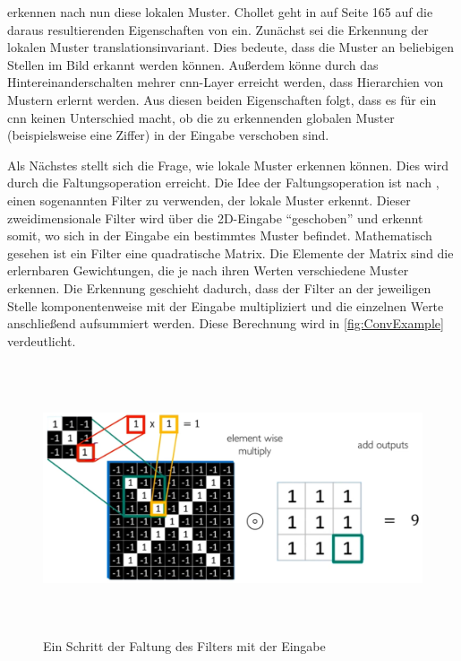 erkennen nach \cite[S. 164]{DeepLearningPythonKeras} nun diese lokalen Muster.
Chollet geht in \cite{DeepLearningPythonKeras} auf Seite 165 auf die daraus resultierenden Eigenschaften von  ein.
Zunächst sei die Erkennung der lokalen Muster translationsinvariant.
Dies bedeute, dass die Muster an beliebigen Stellen im Bild erkannt werden können.
Außerdem könne durch das Hintereinanderschalten mehrer \acrshort{cnn}-Layer erreicht werden, dass Hierarchien von Mustern erlernt werden.
Aus diesen beiden Eigenschaften folgt, dass es für ein \acrshort{cnn} keinen Unterschied macht, ob die zu erkennenden globalen Muster (beispielsweise eine Ziffer) in der Eingabe verschoben sind.

Als Nächstes stellt sich die Frage, wie  lokale Muster erkennen können.
Dies wird durch die Faltungsoperation erreicht.
Die Idee der Faltungsoperation ist nach \cite{6S191CNN}, einen sogenannten Filter zu verwenden, der lokale Muster erkennt.
Dieser zweidimensionale Filter wird über die 2D-Eingabe "`geschoben"' und erkennt somit, wo sich in der Eingabe ein bestimmtes Muster befindet.
Mathematisch gesehen ist ein Filter eine quadratische Matrix.
Die Elemente der Matrix sind die erlernbaren Gewichtungen, die je nach ihren Werten verschiedene Muster erkennen.
Die Erkennung geschieht dadurch, dass der Filter an der jeweiligen Stelle komponentenweise mit der Eingabe multipliziert und die einzelnen Werte anschließend aufsummiert werden.
Diese Berechnung wird in \autoref{fig:ConvExample} verdeutlicht.

\begin{figure}[h]
    \centering
    \includegraphics[width=1.0\textwidth,height=8cm,keepaspectratio=true]{content/images/ConvExample.png}
    \caption{Ein Schritt der Faltung des Filters mit der Eingabe \cite{6S191CNN}}
    \label{fig:ConvExample}
\end{figure}

